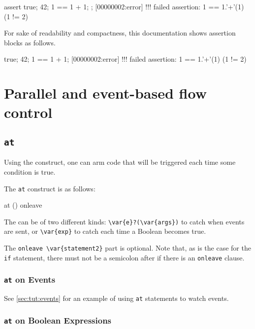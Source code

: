 \begin{urbiscript}
assert
{
  true;
  42;
  1 == 1 + 1;
};
[00000002:error] !!! failed assertion: 1 == 1.'+'(1) (1 != 2)
\end{urbiscript}

For sake of readability and compactness, this documentation shows
assertion blocks as follows.

\begin{urbiassert}
true;
42;
1 == 1 + 1;
[00000002:error] !!! failed assertion: 1 == 1.'+'(1) (1 != 2)
\end{urbiassert}


\section{Parallel and event-based flow control}

\subsection{\lstinline'at'}
\label{sec:lang:at}
Using the  construct, one can arm code that will be
triggered each time some condition is true.

The \lstinline'at' construct is as follows:

\begin{urbiunchecked}
at ()
onleave
\end{urbiunchecked}

The  can be of two different kinds:
\lstinline|\var{e}?(\var{args})| to catch when events are sent, or
\lstinline|\var{exp}| to catch each time a Boolean  becomes
true.

The \lstinline|onleave \var{statement2}| part is optional.  Note that,
as is the case for the \lstinline|if| statement, there must not be a
semicolon after  if there is an \lstinline|onleave|
clause.

\subsubsection{\lstinline'at' on Events}
See \autoref{sec:tut:events} for an example of using \lstinline|at|
statements to watch events.

\subsubsection{\lstinline'at' on Boolean Expressions}


